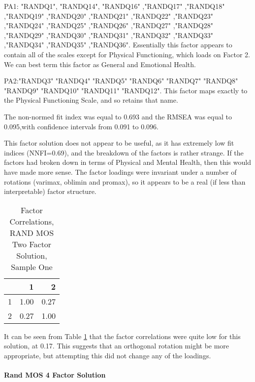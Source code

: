 \documentclass{article}
\begin{document}
PA1: "RANDQ1",  "RANDQ14", "RANDQ16" ,"RANDQ17" ,"RANDQ18" ,"RANDQ19" ,"RANDQ20" ,"RANDQ21" ,"RANDQ22" ,"RANDQ23" ,"RANDQ24" ,"RANDQ25" ,"RANDQ26" ,"RANDQ27"
,"RANDQ28" ,"RANDQ29" ,"RANDQ30" ,"RANDQ31" ,"RANDQ32" ,"RANDQ33" ,"RANDQ34"
,"RANDQ35" ,"RANDQ36". Essentially this factor appears to contain all of the scales except for Physical Functioning, which loads on Factor 2. We can best term this factor as General and Emotional Health.

PA2:"RANDQ3"  "RANDQ4"  "RANDQ5"  "RANDQ6"  "RANDQ7"  "RANDQ8"  "RANDQ9"  "RANDQ10" "RANDQ11" "RANDQ12". This factor maps exactly to the Physical Functioning Scale, and so retains that name.



The non-normed fit index was equal to 0.693
and the RMSEA was equal to 0.095,with confidence intervals from 0.091 to 0.096.

This factor solution does not appear to be useful, as it has extremely low fit indices (NNFI=0.69), and the breakdown of the factors is rather strange. If the factors had broken down in terms of Physical and Mental Health, then this would have made more sense. The factor loadings were invariant under a number of rotations (varimax, oblimin and promax), so it appears to be a real (if less than interpretable) factor structure. 

\begin{table}[ht]
\centering
\begin{tabular}{rrr}
  \hline
 & 1 & 2 \\ 
  \hline
1 & 1.00 & 0.27 \\ 
  2 & 0.27 & 1.00 \\ 
   \hline
\end{tabular}
\caption{Factor Correlations, RAND MOS Two Factor Solution, Sample One} 
\label{tab:tcq1rand4corr}
\end{table}
It can be seen from Table \ref{tab:tcq1rand4corr} that the factor correlations were quite low for this solution, at 0.17. This suggests that an orthogonal rotation might be more appropriate, but attempting this did not change any of the loadings. 



\paragraph{Rand MOS 4 Factor Solution}
\end{document}
